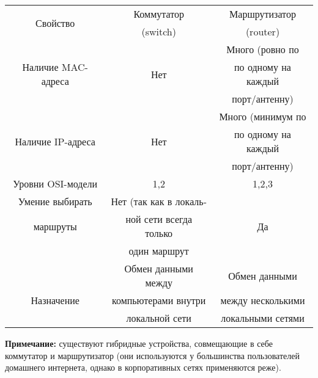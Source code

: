 \begin{table}[!h]
 \begin{tabular}{|c|c|c|}
 \hline
 \multirow{2}{*}{Свойство} & Коммутатор & Маршрутизатор \\
 & (switch) & (router) \\
 \hline
 & & Много (ровно по \\
 Наличие MAC-адреса & Нет & по одному на каждый \\
 & & порт/антенну) \\
 \hline
 & & Много (минимум по \\
 Наличие IP-адреса & Нет & по одному на каждый \\
 & &  порт/антенну) \\
 \hline
 Уровни OSI-модели & 1,2 & 1,2,3 \\
 \hline
 Умение выбирать & Нет (так как в локаль-  & \\
 маршруты & ной сети всегда только  & Да\\
 & один маршрут & \\
 \hline
 & Обмен данными между & Обмен данными  \\
 Назначение & компьютерами внутри & между несколькими  \\
 & локальной сети & локальными сетями \\
 \hline
  \end{tabular}
\end{table}
\textbf{Примечание:} существуют гибридные устройства, совмещающие в себе коммутатор и маршрутизатор (они используются у большинства пользователей домашнего интернета, однако в корпоративных сетях применяются реже).
